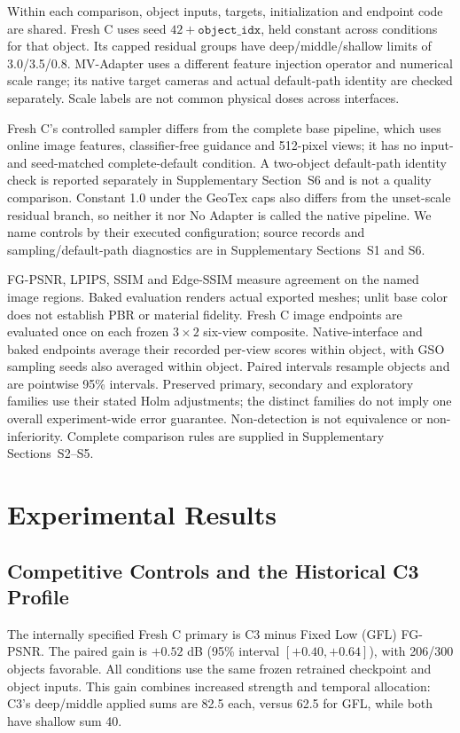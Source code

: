 \documentclass[times,twocolumn,final]{elsarticle}
\begin{document}
Within each comparison, object inputs, targets, initialization and endpoint code are shared. Fresh C uses seed $42+\texttt{object\_idx}$, held constant across conditions for that object. Its capped residual groups have deep/middle/shallow limits of 3.0/3.5/0.8. MV-Adapter uses a different feature injection operator and numerical scale range; its native target cameras and actual default-path identity are checked separately. Scale labels are not common physical doses across interfaces.

Fresh C's controlled sampler differs from the complete base pipeline, which uses online image features, classifier-free guidance and 512-pixel views; it has no input- and seed-matched complete-default condition. A two-object default-path identity check is reported separately in Supplementary Section~S6 and is not a quality comparison. Constant 1.0 under the GeoTex caps also differs from the unset-scale residual branch, so neither it nor No Adapter is called the native pipeline. We name controls by their executed configuration; source records and sampling/default-path diagnostics are in Supplementary Sections~S1 and S6.

FG-PSNR, LPIPS, SSIM and Edge-SSIM measure agreement on the named image regions. Baked evaluation renders actual exported meshes; unlit base color does not establish PBR or material fidelity. Fresh C image endpoints are evaluated once on each frozen $3\times2$ six-view composite. Native-interface and baked endpoints average their recorded per-view scores within object, with GSO sampling seeds also averaged within object. Paired intervals resample objects and are pointwise 95\% intervals. Preserved primary, secondary and exploratory families use their stated Holm adjustments; the distinct families do not imply one overall experiment-wide error guarantee. Non-detection is not equivalence or non-inferiority. Complete comparison rules are supplied in Supplementary Sections~S2--S5.

\section{Experimental Results}
\label{sec:experiments}

\subsection{Competitive Controls and the Historical C3 Profile}
\label{subsec:largescale}

The internally specified Fresh C primary is C3 minus Fixed Low (GFL) FG-PSNR. The paired gain is $+0.52$ dB (95\% interval $[+0.40,+0.64]$), with 206/300 objects favorable. All conditions use the same frozen retrained checkpoint and object inputs. This gain combines increased strength and temporal allocation: C3's deep/middle applied sums are 82.5 each, versus 62.5 for GFL, while both have shallow sum 40.
\end{document}
